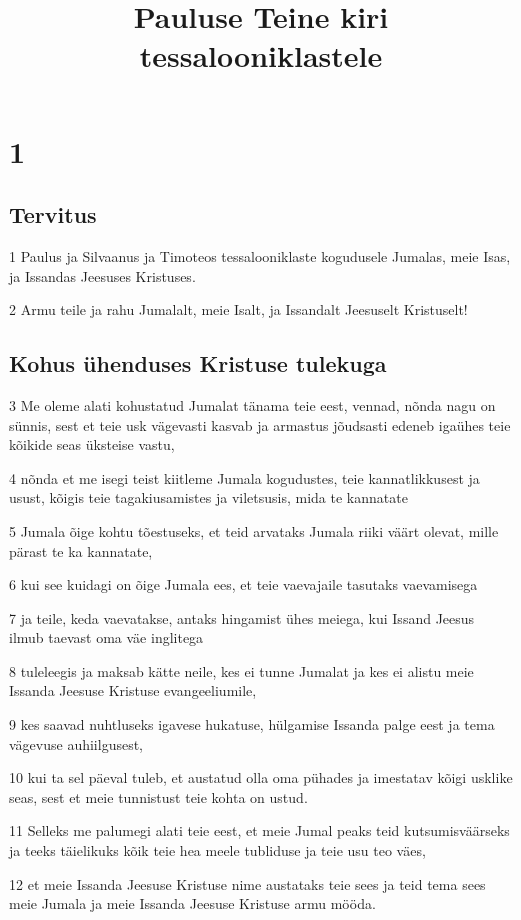 

\title{Pauluse Teine kiri tessalooniklastele}

\chapter{1}

\section*{Tervitus}

\par 1 Paulus ja Silvaanus ja Timoteos tessalooniklaste kogudusele Jumalas, meie Isas, ja Issandas Jeesuses Kristuses.
\par 2 Armu teile ja rahu Jumalalt, meie Isalt, ja Issandalt Jeesuselt Kristuselt!

\section*{Kohus ühenduses Kristuse tulekuga}

\par 3 Me oleme alati kohustatud Jumalat tänama teie eest, vennad, nõnda nagu on sünnis, sest et teie usk vägevasti kasvab ja armastus jõudsasti edeneb igaühes teie kõikide seas üksteise vastu,
\par 4 nõnda et me isegi teist kiitleme Jumala kogudustes, teie kannatlikkusest ja usust, kõigis teie tagakiusamistes ja viletsusis, mida te kannatate
\par 5 Jumala õige kohtu tõestuseks, et teid arvataks Jumala riiki väärt olevat, mille pärast te ka kannatate,
\par 6 kui see kuidagi on õige Jumala ees, et teie vaevajaile tasutaks vaevamisega
\par 7 ja teile, keda vaevatakse, antaks hingamist ühes meiega, kui Issand Jeesus ilmub taevast oma väe inglitega
\par 8 tuleleegis ja maksab kätte neile, kes ei tunne Jumalat ja kes ei alistu meie Issanda Jeesuse Kristuse evangeeliumile,
\par 9 kes saavad nuhtluseks igavese hukatuse, hülgamise Issanda palge eest ja tema vägevuse auhiilgusest,
\par 10 kui ta sel päeval tuleb, et austatud olla oma pühades ja imestatav kõigi usklike seas, sest et meie tunnistust teie kohta on ustud.
\par 11 Selleks me palumegi alati teie eest, et meie Jumal peaks teid kutsumisväärseks ja teeks täielikuks kõik teie hea meele tubliduse ja teie usu teo väes,
\par 12 et meie Issanda Jeesuse Kristuse nime austataks teie sees ja teid tema sees meie Jumala ja meie Issanda Jeesuse Kristuse armu mööda.


